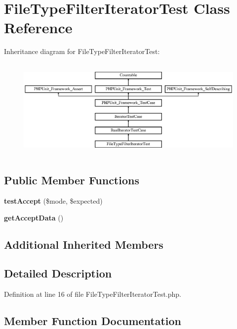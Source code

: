 \section{File\+Type\+Filter\+Iterator\+Test Class Reference}
\label{class_symfony_1_1_component_1_1_finder_1_1_tests_1_1_iterator_1_1_file_type_filter_iterator_test}
Inheritance diagram for File\+Type\+Filter\+Iterator\+Test\+:\begin{figure}[H]
\begin{center}
\leavevmode
\includegraphics[height=4.955752cm]{class_symfony_1_1_component_1_1_finder_1_1_tests_1_1_iterator_1_1_file_type_filter_iterator_test}
\end{center}
\end{figure}
\subsection*{Public Member Functions}
\begin{DoxyCompactItemize}
\item 
{\bf test\+Accept} (\$mode, \$expected)
\item 
{\bf get\+Accept\+Data} ()
\end{DoxyCompactItemize}
\subsection*{Additional Inherited Members}


\subsection{Detailed Description}


Definition at line 16 of file File\+Type\+Filter\+Iterator\+Test.\+php.



\subsection{Member Function Documentation}
